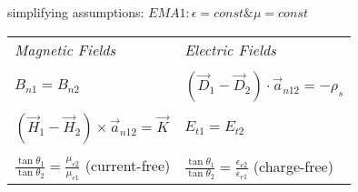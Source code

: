 \vspace{10mm}
simplifying assumptions:  $EMA1:  \epsilon = const \& \mu = const$

\begin{tabular}{ll}
  \emph{Magnetic Fields}                                                                     &
  \emph{Electric Fields}                                                                     \\
                                                                                             &
                                                                                             \\
  $B_{n1} = B_{n2}$                                                                          & 
  $\left( {\vec D}_1 - {\vec D}_2 \right) \cdot {\vec a}_{n12} = - \rho_s$                   \\
                                                                                             &
                                                                                             \\
  $\left( {\vec H}_1 - {\vec H}_2 \right) \times {\vec a}_{n12}  = {\vec K}$                 &
  $E_{t1} = E_{t2}$                                                                          \\
                                                                                             &
                                                                                             \\
  $\frac{\tan \theta_1}{\tan \theta_2} = \frac{\mu_{r2}}     {\mu_{r1}}$      (current-free) &
  $\frac{\tan \theta_1}{\tan \theta_2} = \frac{\epsilon_{r2}}{\epsilon_{r1}}$ (charge-free)  \\
\end{tabular}